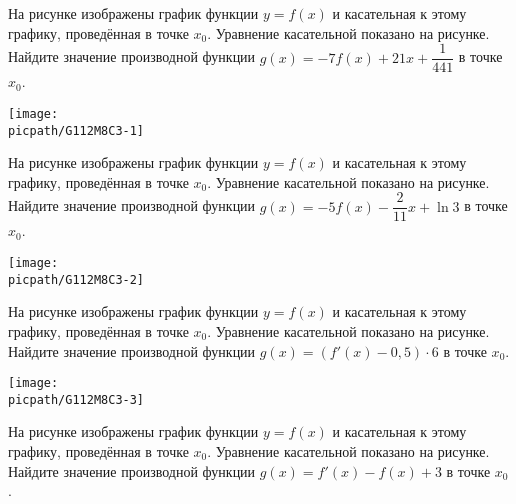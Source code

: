 \begin{class}[number=4]
\begin{listofex}
		\item
		\begin{minipage}[t]{\bodywidth}
			На рисунке изображены график функции \(y=f(x)\) и касательная к этому графику, проведённая в точке \(x_0\). Уравнение касательной показано на рисунке. Найдите значение производной функции \(g(x)=-7f(x)+21x+\dfrac{ 1 }{ 441 }\) в точке \(x_0\).
		\end{minipage}
		\hspace{0.02\linewidth}
		\begin{minipage}[t]{\picwidth}
			\texttt{[image: \\picpath/G112M8C3-1]}
		\end{minipage}
		\item
		\begin{minipage}[t]{\bodywidth}
			На рисунке изображены график функции \(y=f(x)\) и касательная к этому графику, проведённая в точке \(x_0\). Уравнение касательной показано на рисунке. Найдите значение производной функции \(g(x)=-5f(x)-\dfrac{ 2 }{ 11 }x+\ln3\) в точке \(x_0\).
		\end{minipage}
		\hspace{0.02\linewidth}
		\begin{minipage}[t]{\picwidth}
			\texttt{[image: \\picpath/G112M8C3-2]}
		\end{minipage}
		\item
		\begin{minipage}[t]{\bodywidth}
			На рисунке изображены график функции \(y=f(x)\) и касательная к этому графику, проведённая в точке \(x_0\). Уравнение касательной показано на рисунке. Найдите значение производной функции \(g(x)=(f'(x)-0,5)\cdot 6\) в точке \(x_0\).
		\end{minipage}
		\hspace{0.02\linewidth}
		\begin{minipage}[t]{\picwidth}
			\texttt{[image: \\picpath/G112M8C3-3]}
		\end{minipage}
		\item
		\begin{minipage}[t]{\bodywidth}
			На рисунке изображены график функции \(y=f(x)\) и касательная к этому графику, проведённая в точке \(x_0\). Уравнение касательной показано на рисунке. Найдите значение производной функции \(g(x)=f'(x)-f(x)+3\) в точке \(x_0\).
		\end{minipage}
		\hspace{0.02\linewidth}
		\begin{minipage}[t]{\picwidth}

\end{minipage}
\end{listofex}
\end{class}
